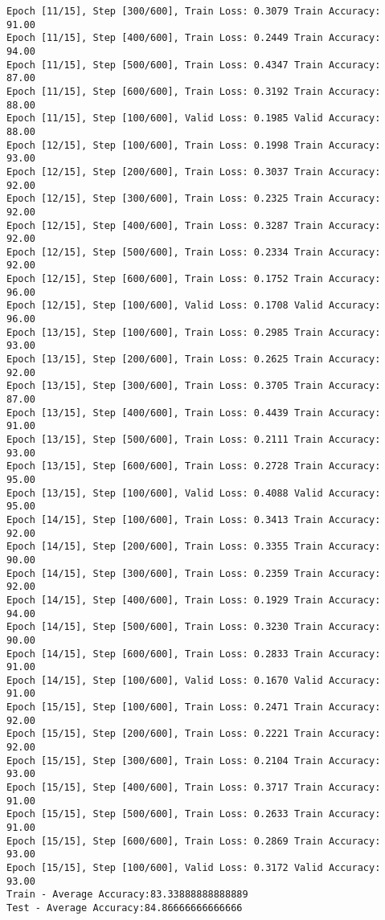 \documentclass[11pt]{article}
\begin{document}
\begin{Verbatim}[commandchars=\\\{\}]
Epoch [11/15], Step [300/600], Train Loss: 0.3079 Train Accuracy: 91.00
Epoch [11/15], Step [400/600], Train Loss: 0.2449 Train Accuracy: 94.00
Epoch [11/15], Step [500/600], Train Loss: 0.4347 Train Accuracy: 87.00
Epoch [11/15], Step [600/600], Train Loss: 0.3192 Train Accuracy: 88.00
Epoch [11/15], Step [100/600], Valid Loss: 0.1985 Valid Accuracy: 88.00
Epoch [12/15], Step [100/600], Train Loss: 0.1998 Train Accuracy: 93.00
Epoch [12/15], Step [200/600], Train Loss: 0.3037 Train Accuracy: 92.00
Epoch [12/15], Step [300/600], Train Loss: 0.2325 Train Accuracy: 92.00
Epoch [12/15], Step [400/600], Train Loss: 0.3287 Train Accuracy: 92.00
Epoch [12/15], Step [500/600], Train Loss: 0.2334 Train Accuracy: 92.00
Epoch [12/15], Step [600/600], Train Loss: 0.1752 Train Accuracy: 96.00
Epoch [12/15], Step [100/600], Valid Loss: 0.1708 Valid Accuracy: 96.00
Epoch [13/15], Step [100/600], Train Loss: 0.2985 Train Accuracy: 93.00
Epoch [13/15], Step [200/600], Train Loss: 0.2625 Train Accuracy: 92.00
Epoch [13/15], Step [300/600], Train Loss: 0.3705 Train Accuracy: 87.00
Epoch [13/15], Step [400/600], Train Loss: 0.4439 Train Accuracy: 91.00
Epoch [13/15], Step [500/600], Train Loss: 0.2111 Train Accuracy: 93.00
Epoch [13/15], Step [600/600], Train Loss: 0.2728 Train Accuracy: 95.00
Epoch [13/15], Step [100/600], Valid Loss: 0.4088 Valid Accuracy: 95.00
Epoch [14/15], Step [100/600], Train Loss: 0.3413 Train Accuracy: 92.00
Epoch [14/15], Step [200/600], Train Loss: 0.3355 Train Accuracy: 90.00
Epoch [14/15], Step [300/600], Train Loss: 0.2359 Train Accuracy: 92.00
Epoch [14/15], Step [400/600], Train Loss: 0.1929 Train Accuracy: 94.00
Epoch [14/15], Step [500/600], Train Loss: 0.3230 Train Accuracy: 90.00
Epoch [14/15], Step [600/600], Train Loss: 0.2833 Train Accuracy: 91.00
Epoch [14/15], Step [100/600], Valid Loss: 0.1670 Valid Accuracy: 91.00
Epoch [15/15], Step [100/600], Train Loss: 0.2471 Train Accuracy: 92.00
Epoch [15/15], Step [200/600], Train Loss: 0.2221 Train Accuracy: 92.00
Epoch [15/15], Step [300/600], Train Loss: 0.2104 Train Accuracy: 93.00
Epoch [15/15], Step [400/600], Train Loss: 0.3717 Train Accuracy: 91.00
Epoch [15/15], Step [500/600], Train Loss: 0.2633 Train Accuracy: 91.00
Epoch [15/15], Step [600/600], Train Loss: 0.2869 Train Accuracy: 93.00
Epoch [15/15], Step [100/600], Valid Loss: 0.3172 Valid Accuracy: 93.00
Train - Average Accuracy:83.33888888888889
Test - Average Accuracy:84.86666666666666

    \end{Verbatim}
\end{document}
